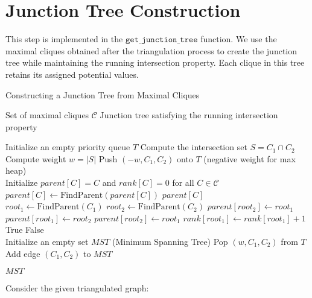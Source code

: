 \documentclass{article}
\begin{document}
\section{Junction Tree Construction}
This step is implemented in the $\texttt{get\_junction\_tree}$ function. We use the maximal cliques obtained after the triangulation process to create the junction tree while maintaining the running intersection property. Each clique in this tree retains its assigned potential values.
\begin{algorithm}
\caption{Constructing a Junction Tree from Maximal Cliques}
\begin{algorithmic}[1]
\Require Set of maximal cliques $\mathcal{C}$
\Ensure Junction tree satisfying the running intersection property

\State Initialize an empty priority queue $T$
    \State Compute the intersection set $S = C_1 \cap C_2$
        \State Compute weight $w = |S|$
        \State Push $(-w, C_1, C_2)$ onto $T$ (negative weight for max heap)
    \EndIf
\EndFor
\\
\State Initialize $parent[C] = C$ and $rank[C] = 0$ for all $C \in \mathcal{C}$
\\
        \State $parent[C] \gets \text{FindParent}(parent[C])$
    \EndIf
    \State \Return $parent[C]$
\EndFunction
\\
    \State $root_1 \gets \text{FindParent}(C_1)$
    \State $root_2 \gets \text{FindParent}(C_2)$
            \State $parent[root_2] \gets root_1$
            \State $parent[root_1] \gets root_2$
        \Else
            \State $parent[root_2] \gets root_1$
            \State $rank[root_1] \gets rank[root_1] + 1$
        \EndIf
        \State \Return True
    \EndIf
    \State \Return False
\EndFunction
\\
\State Initialize an empty set $MST$ (Minimum Spanning Tree)
    \State Pop $(w, C_1, C_2)$ from $T$
        \State Add edge $(C_1, C_2)$ to $MST$
    \EndIf
\EndWhile

\State \Return $MST$
\end{algorithmic}
\end{algorithm}
Consider the given triangulated graph:
\end{document}
